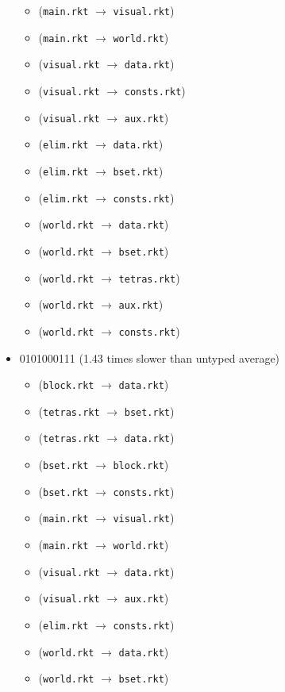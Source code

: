 \documentclass{article}
\newcommand{\mono}[1]{\texttt{#1}}
\begin{document}
\begin{itemize}
\begin{itemize}
  \item (\mono{main.rkt} $\rightarrow$ \mono{visual.rkt})
  \item (\mono{main.rkt} $\rightarrow$ \mono{world.rkt})
  \item (\mono{visual.rkt} $\rightarrow$ \mono{data.rkt})
  \item (\mono{visual.rkt} $\rightarrow$ \mono{consts.rkt})
  \item (\mono{visual.rkt} $\rightarrow$ \mono{aux.rkt})
  \item (\mono{elim.rkt} $\rightarrow$ \mono{data.rkt})
  \item (\mono{elim.rkt} $\rightarrow$ \mono{bset.rkt})
  \item (\mono{elim.rkt} $\rightarrow$ \mono{consts.rkt})
  \item (\mono{world.rkt} $\rightarrow$ \mono{data.rkt})
  \item (\mono{world.rkt} $\rightarrow$ \mono{bset.rkt})
  \item (\mono{world.rkt} $\rightarrow$ \mono{tetras.rkt})
  \item (\mono{world.rkt} $\rightarrow$ \mono{aux.rkt})
  \item (\mono{world.rkt} $\rightarrow$ \mono{consts.rkt})
  \end{itemize}
\item 0101000111 (1.43 times slower than untyped average)
  \begin{itemize}
  \item (\mono{block.rkt} $\rightarrow$ \mono{data.rkt})
  \item (\mono{tetras.rkt} $\rightarrow$ \mono{bset.rkt})
  \item (\mono{tetras.rkt} $\rightarrow$ \mono{data.rkt})
  \item (\mono{bset.rkt} $\rightarrow$ \mono{block.rkt})
  \item (\mono{bset.rkt} $\rightarrow$ \mono{consts.rkt})
  \item (\mono{main.rkt} $\rightarrow$ \mono{visual.rkt})
  \item (\mono{main.rkt} $\rightarrow$ \mono{world.rkt})
  \item (\mono{visual.rkt} $\rightarrow$ \mono{data.rkt})
  \item (\mono{visual.rkt} $\rightarrow$ \mono{aux.rkt})
  \item (\mono{elim.rkt} $\rightarrow$ \mono{consts.rkt})
  \item (\mono{world.rkt} $\rightarrow$ \mono{data.rkt})
  \item (\mono{world.rkt} $\rightarrow$ \mono{bset.rkt})

\end{itemize}
\end{itemize}
\end{document}
